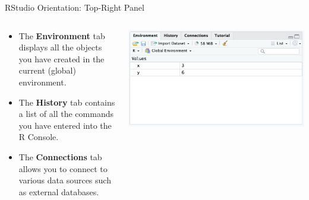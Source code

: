 \documentclass[aspectratio=169,xcolor=dvipsnames]{beamer}
\begin{document}
\begin{frame}{RStudio Orientation: Top-Right Panel}

\begin{columns}
        \begin{column}{0.5\textwidth}
	\begin{itemize}
	\item The \textbf{Environment} tab displays all the objects you have created in the current (global) environment. 
	\item The \textbf{History} tab contains a list of all the commands you have entered into the R Console.
	\item The \textbf{Connections} tab allows you to connect to various data sources such as external databases.
	\end{itemize}
        \end{column}

        \begin{column}{0.5\textwidth}
            \centering
            \includegraphics[scale=0.32]{images/env.png}
        \end{column}
    \end{columns}
\end{frame}
\end{document}
